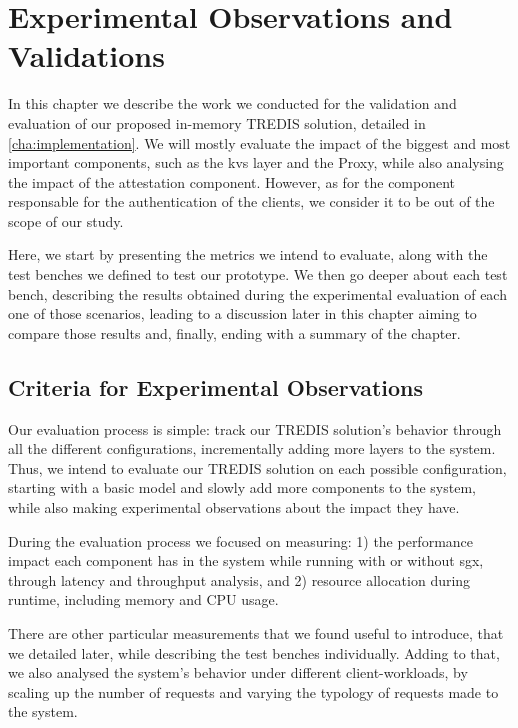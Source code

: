 \chapter{Experimental Observations and Validations}
\label{cha:experimentalEvaluation}

In this chapter we describe the work we conducted for the validation and evaluation of our proposed in-memory TREDIS solution, detailed in \ref{cha:implementation}. We will mostly evaluate the impact of the biggest and most important components, such as the \gls{kvs} layer and the Proxy, while also analysing the impact of the attestation component. However, as for the component responsable for the authentication of the clients, we consider it to be out of the scope of our study.

Here, we start by presenting the metrics we intend to evaluate, along with the test benches we defined to test our prototype.
We then go deeper about each test bench, describing the results obtained during the experimental evaluation of each one of those scenarios, leading to a discussion later in this chapter aiming to compare those results and, finally, ending with a summary of the chapter.


\section{Criteria for Experimental Observations}
\label{sec:criteriaForExperimentalObservations}

Our evaluation process is simple: track our TREDIS solution's behavior through all the different configurations, incrementally adding more layers to the system. Thus, we intend to evaluate our TREDIS solution on each possible configuration, starting with a basic model and slowly add more components to the system, while also making experimental observations about the impact they have. 

During the evaluation process we focused on measuring: 1) the performance impact each component has in the system while running with or without \gls{sgx}, through latency and throughput analysis, and 2) resource allocation during runtime, including memory and CPU usage. 

There are other particular measurements that we found useful to introduce, that we detailed later, while describing the test benches individually.
Adding to that, we also analysed the system's behavior under different client-workloads, by scaling up the number of requests and varying the typology of requests made to the system.


